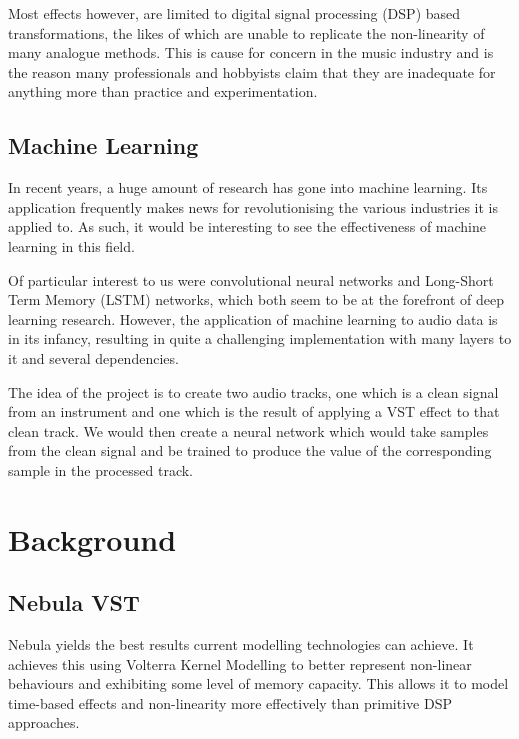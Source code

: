 \documentclass{l4proj}
\begin{document}
Most effects however, are limited to digital signal processing (DSP)
based transformations, the likes of which are unable to replicate the
non-linearity of many analogue methods. This is cause for concern in the
music industry and is the reason many professionals and hobbyists claim
that they are inadequate for anything more than practice and
experimentation.

\hypertarget{machine-learning}{%
\section{Machine Learning}\label{machine-learning}}

In recent years, a huge amount of research has gone into machine
learning. Its application frequently makes news for revolutionising the
various industries it is applied to. As such, it would be interesting to
see the effectiveness of machine learning in this field.

Of particular interest to us were convolutional neural networks and
Long-Short Term Memory (LSTM) networks, which both seem to be at the
forefront of deep learning research. However, the application of machine
learning to audio data is in its infancy, resulting in quite a
challenging implementation with many layers to it and several
dependencies.

The idea of the project is to create two audio tracks, one which is a
clean signal from an instrument and one which is the result of applying
a VST effect to that clean track. We would then create a neural network
which would take samples from the clean signal and be trained to produce
the value of the corresponding sample in the processed track.

\hypertarget{background}{%
\chapter{Background}\label{background}}

\hypertarget{nebula-vst}{%
\section{Nebula VST}\label{nebula-vst}}

Nebula yields the best results current modelling technologies can
achieve. It achieves this using Volterra Kernel Modelling to better
represent non-linear behaviours and exhibiting some level of memory
capacity. This allows it to model time-based effects and non-linearity
more effectively than primitive DSP approaches.
\end{document}
